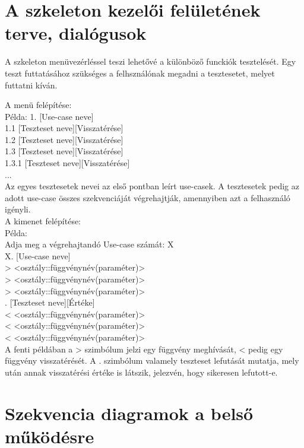 \section{A szkeleton kezelői felületének terve, dialógusok}
A szkeleton menüvezérléssel teszi lehetővé a különböző funckiók tesztelését. Egy teszt futtatásához szükséges a felhsználónak
megadni a tesztesetet, melyet futtatni kíván. 

A menü felépítése: \\

Példa:
1. [Use-case neve] \\
1.1 [Teszteset neve][Visszatérése] \\
1.2 [Teszteset neve][Visszatérése] \\
1.3 [Teszteset neve][Visszatérése] \\
   1.3.1 [Teszteset neve][Visszatérése] \\
... \\

Az egyes tesztesetek nevei az első pontban leírt use-casek. A tesztesetek pedig
az adott use-case összes szekvenciáját végrehajtják, amennyiben azt a felhasználó igényli. \\

A kimenet felépítése: \\

Példa: \\

Adja meg a végrehajtandó Use-case számát: X \\
X. [Use-case neve] \\
>   <osztály::függvénynév(paraméter)> \\
>         <osztály::függvénynév(paraméter)> \\
>               <osztály::függvénynév(paraméter)> \\
.                    [Teszteset neve][Értéke] \\
<               <osztály::függvénynév(paraméter)> \\
<         <osztály::függvénynév(paraméter)> \\
<   <osztály::függvénynév(paraméter)> \\

A fenti példában a > szimbólum jelzi egy függvény meghívását, < pedig egy függvény
visszatérését. A . szimbólum valamely teszteset lefutását mutatja, mely után annak 
visszatérési értéke is látszik, jelezvén, hogy sikeresen lefutott-e. \\


\clearpage
\section{Szekvencia diagramok a belső működésre}

